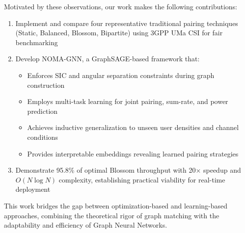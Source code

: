 Motivated by these observations, our work makes the following contributions:

\begin{enumerate}
    \item Implement and compare four representative traditional pairing techniques (Static, Balanced, Blossom, Bipartite) using 3GPP UMa CSI for fair benchmarking
    
    \item Develop NOMA-GNN, a GraphSAGE-based framework that:
    \begin{itemize}
        \item Enforces SIC and angular separation constraints during graph construction
        \item Employs multi-task learning for joint pairing, sum-rate, and power prediction
        \item Achieves inductive generalization to unseen user densities and channel conditions
        \item Provides interpretable embeddings revealing learned pairing strategies
    \end{itemize}
    
    \item Demonstrate 95.8\% of optimal Blossom throughput with 20× speedup and $O(N \log N)$ complexity, establishing practical viability for real-time deployment
\end{enumerate}

This work bridges the gap between optimization-based and learning-based approaches, combining the theoretical rigor of graph matching with the adaptability and efficiency of Graph Neural Networks.

